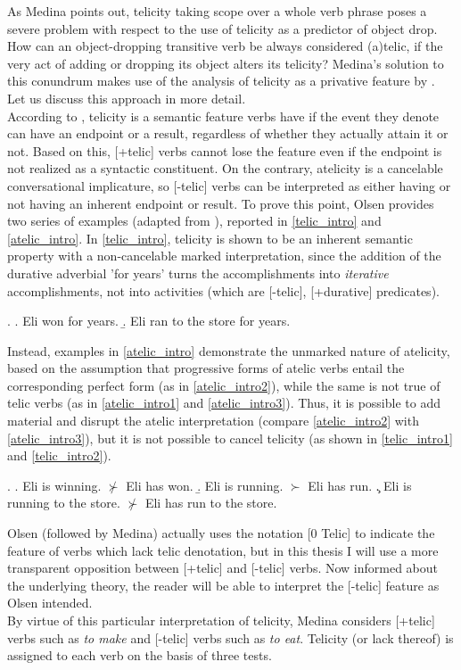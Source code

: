 As Medina points out, telicity taking scope over a whole verb phrase poses a severe problem with respect to the use of telicity as a predictor of object drop. How can an object-dropping transitive verb be always considered (a)telic, if the very act of adding or dropping its object alters its telicity? Medina's solution to this conundrum makes use of the analysis of telicity as a privative feature by \textcite{Olsen1997}. Let us discuss this approach in more detail.\\
According to \textcite[32]{Olsen1997}, telicity is a semantic feature verbs have if the event they denote can have an endpoint or a result, regardless of whether they actually attain it or not. Based on this, [+telic] verbs cannot lose the feature even if the endpoint is not realized as a syntactic constituent. On the contrary, atelicity is a cancelable conversational implicature, so [-telic] verbs can be interpreted as either having or not having an inherent endpoint or result. To prove this point, Olsen provides two series of examples (adapted from \textcite[33]{Olsen1997}), reported in \ref{telic_intro} and \ref{atelic_intro}. In \ref{telic_intro}, telicity is shown to be an inherent semantic property with a non-cancelable marked interpretation, since the addition of the durative adverbial 'for years' turns the accomplishments into \textit{iterative} accomplishments, not into activities (which are [-telic], [+durative] predicates).

\ex. \label{telic_intro} \a. \label{telic_intro1} Eli won for years.
\b. \label{telic_intro2}  Eli ran to the store for years.

Instead, examples in \ref{atelic_intro} demonstrate the unmarked nature of atelicity, based on the assumption that progressive forms of atelic verbs entail the corresponding perfect form (as in \ref{atelic_intro2}), while the same is not true of telic verbs (as in \ref{atelic_intro1} and \ref{atelic_intro3}). Thus, it is possible to add material and disrupt the atelic interpretation (compare \ref{atelic_intro2} with \ref{atelic_intro3}), but it is not possible to cancel telicity (as shown in \ref{telic_intro1} and \ref{telic_intro2}).

\ex. \label{atelic_intro} \a. \label{atelic_intro1} Eli is winning. $\nsucc$ Eli has won.
\b. \label{atelic_intro2}  Eli is running. $\succ$ Eli has run.
\c. \label{atelic_intro3}  Eli is running to the store. $\nsucc$ Eli has run to the store.

Olsen (followed by Medina) actually uses the notation [0 Telic] to indicate the feature of verbs which lack telic denotation, but in this thesis I will use a more transparent opposition between [+telic] and [-telic] verbs. Now informed about the underlying theory, the reader will be able to interpret the [-telic] feature as Olsen intended.\\
By virtue of this particular interpretation of telicity, Medina considers [+telic] verbs such as \textit{to make} and [-telic] verbs such as \textit{to eat}. Telicity (or lack thereof) is assigned to each verb on the basis of three tests.

